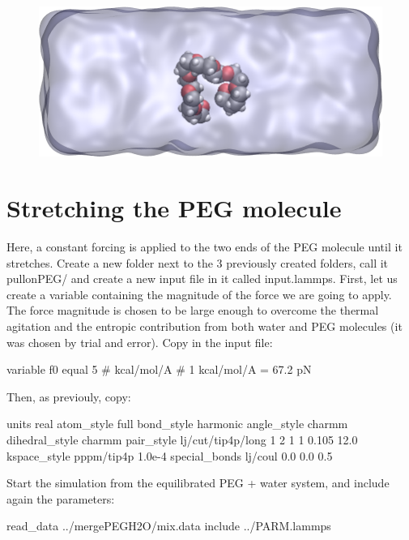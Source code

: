 \begin{figure}
\includegraphics[width=\linewidth]{tutorials/level2/polymer-in-water/solvatedPEG_light.png}
\end{figure}

\section{Stretching the PEG molecule}

\noindent Here, a constant forcing is applied to the two ends of the
PEG molecule until it stretches. Create a new folder next
to the 3 previously created folders, call it pullonPEG/
and create a new input file in it called input.lammps.
First, let us create a variable containing the magnitude
of the force we are going to apply. The force magnitude is
chosen to be large enough to overcome the thermal
agitation and the entropic contribution from both water
and PEG molecules (it was chosen by trial and error). Copy
in the input file:

\begin{lcverbatim}
variable f0 equal 5 # kcal/mol/A # 1 kcal/mol/A = 67.2 pN
\end{lcverbatim}

\noindent Then, as previouly, copy:

\begin{lcverbatim}
units real
atom_style full
bond_style harmonic
angle_style charmm
dihedral_style charmm
pair_style lj/cut/tip4p/long 1 2 1 1 0.105 12.0
kspace_style pppm/tip4p 1.0e-4
special_bonds lj/coul 0.0 0.0 0.5
\end{lcverbatim}

\noindent Start the simulation from the equilibrated PEG + water
system, and include again the parameters:

\begin{lcverbatim}
read_data ../mergePEGH2O/mix.data
include ../PARM.lammps
\end{lcverbatim}

